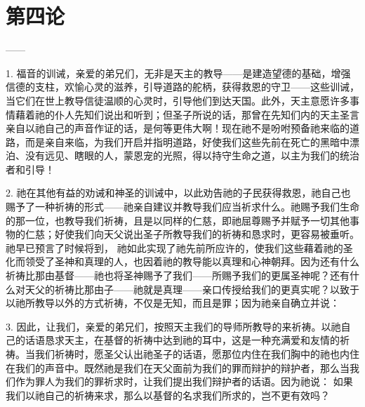

\section{第四论}

\par

 ——\par

1. 福音的训诫，亲爱的弟兄们，无非是天主的教导——是建造望德的基础，增强信德的支柱，欢愉心灵的滋养，引导道路的舵柄，获得救恩的守卫——这些训诫，当它们在世上教导信徒温顺的心灵时，引导他们到达天国。此外，天主意愿许多事情藉着祂的仆人先知们说出和听到；但圣子所说的话，那曾在先知们内的天主圣言亲自以祂自己的声音作证的话，是何等更伟大啊！现在祂不是吩咐预备祂来临的道路，而是亲自来临，为我们开启并指明道路，好使我们这些先前在死亡的黑暗中漂泊、没有远见、瞎眼的人，蒙恩宠的光照，得以持守生命之道，以主为我们的统治者和引导！\par

2. 祂在其他有益的劝诫和神圣的训诫中，以此劝告祂的子民获得救恩，祂自己也赐予了一种祈祷的形式——祂亲自建议并教导我们应当祈求什么。祂赐予我们生命的那一位，也教导我们祈祷，且是以同样的仁慈，即祂屈尊赐予并赋予一切其他事物的仁慈；好使我们向天父说出圣子所教导我们的祈祷和恳求时，更容易被垂听。祂早已预言了时候将到， 祂如此实现了祂先前所应许的，使我们这些藉着祂的圣化而领受了圣神和真理的人，也因着祂的教导能以真理和心神朝拜。因为还有什么祈祷比那由基督——祂也将圣神赐予了我们——所赐予我们的更属圣神呢？还有什么对天父的祈祷比那由子——祂就是真理——亲口传授给我们的更真实呢？以致于以祂所教导以外的方式祈祷，不仅是无知，而且是罪；因为祂亲自确立并说：\par

3. 因此，让我们，亲爱的弟兄们，按照天主我们的导师所教导的来祈祷。以祂自己的话语恳求天主，在基督的祈祷中达到祂的耳中，这是一种充满爱和友情的祈祷。当我们祈祷时，愿圣父认出祂圣子的话语，愿那位内住在我们胸中的祂也内住在我们的声音中。既然祂是我们在天父面前为我们的罪而辩护的辩护者，那么当我们作为罪人为我们的罪祈求时，让我们提出我们辩护者的话语。因为祂说： 如果我们以祂自己的祈祷来求，那么以基督的名求我们所求的，岂不更有效吗？\par

